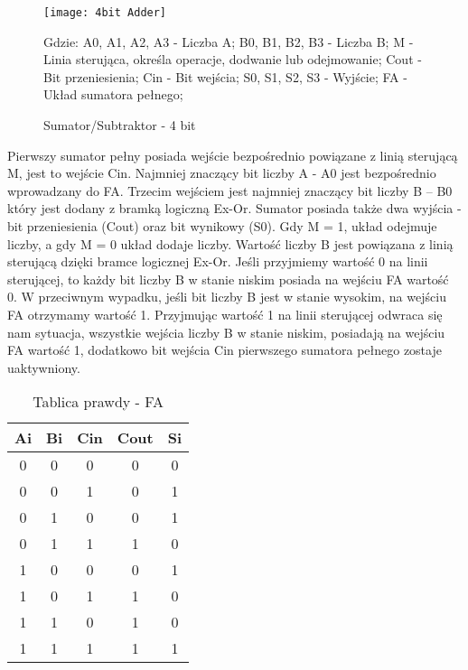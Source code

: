 \documentclass[12pt, a4paper, onside, polish]{article}				%
\begin{document}
 \begin{figure}[hbt!]
{\centering \texttt{[image: 4bit Adder]} \caption{Sumator/Subtraktor - 4 bit}}\vspace{5mm}
Gdzie:\newline
A0, A1, A2, A3 - Liczba A;\newline
B0, B1, B2, B3 - Liczba B;\newline
M - Linia sterująca, określa operacje, dodwanie lub odejmowanie;\newline
Cout - Bit przeniesienia;\newline
Cin - Bit wejścia;\newline
S0, S1, S2, S3 - Wyjście; \newline
FA - Układ sumatora pełnego; \newline\newline
\end{figure}

Pierwszy sumator pełny posiada wejście bezpośrednio powiązane z linią sterującą M, jest to wejście Cin. Najmniej znaczący bit liczby A - A0 jest bezpośrednio wprowadzany do FA. Trzecim wejściem jest najmniej znaczący bit liczby B – B0 który jest dodany z bramką logiczną Ex-Or. Sumator posiada także dwa wyjścia - bit przeniesienia (Cout) oraz bit wynikowy (S0). Gdy M = 1, układ odejmuje liczby, a gdy M = 0 układ dodaje liczby. Wartość liczby B jest powiązana z linią sterującą dzięki bramce logicznej Ex-Or. Jeśli przyjmiemy wartość 0 na linii sterującej, to każdy bit liczby B w stanie niskim posiada na wejściu FA wartość 0.  W przeciwnym wypadku, jeśli bit liczby B jest w stanie wysokim, na wejściu FA otrzymamy wartość 1. Przyjmując wartość 1 na linii sterującej odwraca się nam sytuacja, wszystkie wejścia liczby B w stanie niskim, posiadają na wejściu FA wartość 1, dodatkowo bit wejścia Cin pierwszego sumatora pełnego zostaje uaktywniony.  


\begin{table}[htb]
\caption{Tablica prawdy - FA}
\centering
\begin{tabular}{|c|c|c|c|c|}
\hline
\textbf{Ai} & \textbf{Bi} & \textbf{Cin} & \textbf{Cout} & \textbf{Si} \\ \hline
0           & 0           & 0            & 0             & 0           \\ \hline
0           & 0           & 1            & 0             & 1           \\ \hline
0           & 1           & 0            & 0             & 1           \\ \hline
0           & 1           & 1            & 1             & 0           \\ \hline
1           & 0           & 0            & 0             & 1           \\ \hline
1           & 0           & 1            & 1             & 0           \\ \hline
1           & 1           & 0            & 1             & 0           \\ \hline
1           & 1           & 1            & 1             & 1           \\ \hline
\end{tabular}
\end{table}
\cleardoublepage
\end{document}

